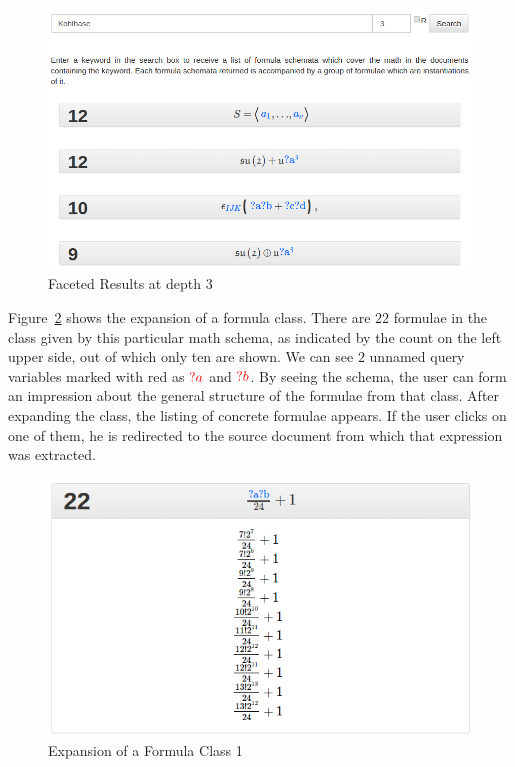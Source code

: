 \documentclass[a4paper,oneside]{article}
\def\red#1{\textcolor{red}{#1}}
\begin{document}
\begin{figure}[ht]\centering
    \includegraphics[width=12.1cm]{img/schemataGroup.png}
    \caption{Faceted Results at depth 3}\label{fig:schemata_group}
\end{figure}
\FloatBarrier

Figure~\ref{fig:schema_instantiation} shows the expansion of a formula class.
There are $22$ formulae in the class given by this particular math schema, as
indicated by the count on the left upper side, out of which only ten are shown.
We can see $2$ unnamed query variables marked with red as $\red{?a}$ and
$\red{?b}$. By seeing the schema, the user can form an impression about the
general structure of the formulae from that class. After expanding the class,
the listing of concrete formulae appears. If the user clicks on one of them, he
is redirected to the source document from which that expression was extracted.

\begin{figure}[ht]\centering
    \includegraphics[width=12.1cm]{img/schemaInstGood.png}
    \caption{Expansion of a Formula Class 1}\label{fig:schema_instantiation}
\end{figure}
\FloatBarrier
\end{document}
